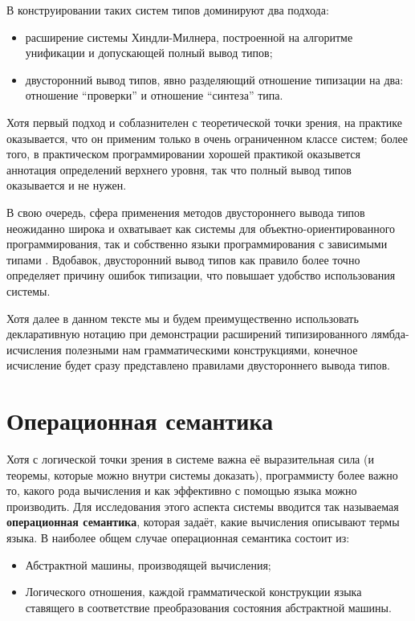 \documentclass[12pt]{article}
\begin{document}
В конструировании таких систем типов доминируют два подхода:

\begin{itemize}
  \item расширение системы Хиндли-Милнера, построенной на алгоритме унификации и
    допускающей полный вывод типов;
  \item двусторонний вывод типов, явно разделяющий отношение типизации на два:
    отношение ``проверки'' и отношение ``синтеза'' типа.
\end{itemize}

Хотя первый подход и соблазнителен с теоретической точки зрения, на практике
оказывается, что он применим только в очень ограниченном классе систем; более
того, в практическом программировании хорошей практикой оказывется аннотация
определений верхнего уровня, так что полный вывод типов оказывается и не нужен.

В свою очередь, сфера применения методов двустороннего вывода типов неожиданно
широка и охватывает как системы для объектно-ориентированного программирования,
так и собственно языки программирования с зависимыми типами \cite{bidir}.
Вдобавок, двусторонний вывод типов как правило более точно определяет причину
ошибок типизации, что повышает удобство использования системы.

Хотя далее в данном тексте мы и будем преимущественно использовать декларативную
нотацию при демонстрации расширений типизированного лямбда-исчисления полезными
нам грамматическими конструкциями, конечное исчисление будет сразу представлено
правилами двустороннего вывода типов.

\section{Операционная семантика}

Хотя с логической точки зрения в системе важна её выразительная сила (и теоремы,
которые можно внутри системы доказать), программисту более важно то, какого рода
вычисления и как эффективно с помощью языка можно производить. Для исследования
этого аспекта системы вводится так называемая \textbf{операционная семантика},
которая задаёт, какие вычисления описывают термы языка. В наиболее общем случае
операционная семантика состоит из:

\begin{itemize}
  \item Абстрактной машины, производящей вычисления;
  \item Логического отношения, каждой грамматической конструкции языка ставящего
    в соответствие преобразования состояния абстрактной машины.
\end{itemize}
\end{document}
